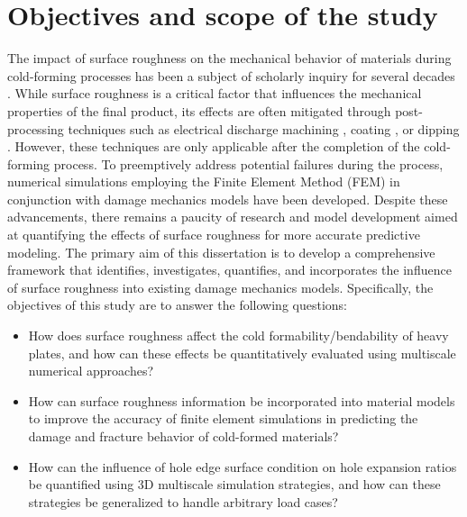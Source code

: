 \section{Objectives and scope of the study}\label{ch:intro:se:obj}

The impact of surface roughness on the mechanical behavior of materials during cold-forming processes has been a subject of scholarly inquiry for several decades \autocite{ahnRelationshipShearStrength2021,bazriMechanicalTribometallurgicalBehavior2022,csertaEffectsGraniteformingMinerals2021,grochePredictionEvolutionSurface2015,heruthunnisaInvestigationsFormabilityTensile2022}. While surface roughness is a critical factor that influences the mechanical properties of the final product, its effects are often mitigated through post-processing techniques such as electrical discharge machining \autocite{amorimSurfaceModificationTool2017}, coating \autocite{creusCorrosionBehaviourTiN1998}, or dipping \autocite{karduckCharacterisationIntermediateLayers1997}. However, these techniques are only applicable after the completion of the cold-forming process. To preemptively address potential failures during the process, numerical simulations employing the Finite Element Method (FEM) in conjunction with damage mechanics models have been developed. Despite these advancements, there remains a paucity of research and model development aimed at quantifying the effects of surface roughness for more accurate predictive modeling.
The primary aim of this dissertation is to develop a comprehensive framework that identifies, investigates, quantifies, and incorporates the influence of surface roughness into existing damage mechanics models. Specifically, the objectives of this study are to answer the following questions:
\begin{itemize}
\item How does surface roughness affect the cold formability/bendability of heavy plates, and how can these effects be quantitatively evaluated using multiscale numerical approaches?
\item How can surface roughness information be incorporated into material models to improve the accuracy of finite element simulations in predicting the damage and fracture behavior of cold-formed materials?
\item How can the influence of hole edge surface condition on hole expansion ratios be quantified using 3D multiscale simulation strategies, and how can these strategies be generalized to handle arbitrary load cases?
\end{itemize}
